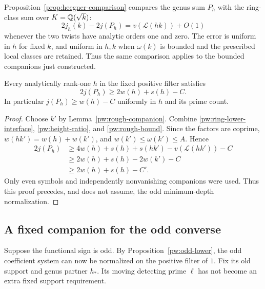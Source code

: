 Proposition~\ref{prop:heegner-comparison} compares the genus sum $P_h$
with the ring-class sum over $K=\mathbb Q(\sqrt{k})$:
\begin{equation}\label{pw:height-ratio}
 2j_h(k)-2j(P_h)=v(\mathcal L(hk))+O(1)
\end{equation}
whenever the two twists have analytic orders one and zero.
The error is uniform in $h$ for fixed $k$, and uniform in $h,k$ when
$\omega(k)$ is bounded and the prescribed local classes are retained.
Thus the same comparison applies to the bounded companions just constructed.

\begin{proposition}
\label{pw:odd-lower}\label{prop:rational-odd-bound}
Every analytically rank-one $h$ in the fixed positive filter satisfies
\begin{equation}\label{pw:odd-lower-bound}
 2j(P_h)\ge 2w(h)+s(h)-C.
\end{equation}
In particular $j(P_h)\ge w(h)-C$ uniformly in $h$ and its prime count.
\end{proposition}

\begin{proof}
Choose $k'$ by Lemma~\ref{pw:rough-companion}.  Combine
\eqref{pw:ring-lower-interface}, \eqref{pw:height-ratio}, and
\eqref{pw:rough-bound}.  Since the factors are coprime,
$w(hk')=w(h)+w(k')$, and $w(k')\le\omega(k')\le A$.  Hence
\begin{align*}
 2j(P_h)
 &\ge 4w(h)+s(h)+s(hk')-v(\mathcal L(hk'))-C\\
 &\ge 2w(h)+s(h)-2w(k')-C\\
 &\ge 2w(h)+s(h)-C'.
\end{align*}
Only even symbols and independently nonvanishing companions were used.
Thus this proof precedes, and does not assume, the odd minimum-depth
normalization.
\end{proof}

\subsection{A fixed companion for the odd converse}
\label{pw:fixed-companion-section}

Suppose the functional sign is odd. By
Proposition~\ref{pw:odd-lower}, the odd coefficient system can now be
normalized on the positive filter of $1$.  Fix its old support and genus
partner $h_*$.  Its moving detecting prime $\ell$ has not become an
extra fixed support requirement.

